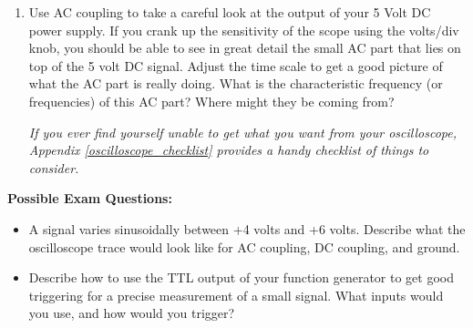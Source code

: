 \begin{enumerate}[wide]
\item Use AC coupling to take a careful look at the output of your 5 Volt DC power supply.  If you crank up the sensitivity of the scope using the volts/div knob, you should be able to see in great detail the small AC part that lies on top of the 5 volt DC signal.  Adjust the time scale to get a good picture of what the AC part is really doing.  What is the characteristic frequency (or frequencies) of this AC part?  Where might they be coming from?

\bigskip

\textit{If you ever find yourself unable to get what you want from your oscilloscope, Appendix \ref{oscilloscope_checklist} provides a handy checklist of things to consider.}

\end{enumerate}


\textbf{Possible Exam Questions:}

\begin{itemize}

\item A signal varies sinusoidally between +4 volts and +6 volts.  Describe what the oscilloscope trace would look like for AC coupling, DC coupling, and ground.

\item Describe how to use the TTL output of your function generator to get good triggering for a precise measurement of a small signal. What inputs would you use, and how would you trigger? 

\end{itemize}





